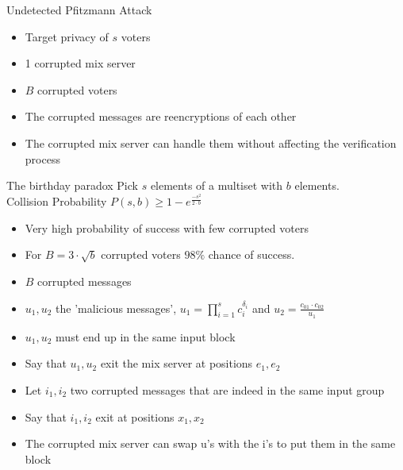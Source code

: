 \documentclass{beamer}
\begin{document}
\begin{frame}[allowframebreaks]{Undetected Pfitzmann Attack}
\begin{itemize}
\item Target privacy of $s$ voters
\item 1 corrupted mix server
\item $B$ corrupted voters
\item The corrupted messages are reencryptions of each other
\item The corrupted mix server can handle them without affecting the verification process 
\end{itemize}
\begin{block}{The birthday paradox}
Pick $s$ elements of a multiset with $b$ elements. \\
Collision Probability $P(s,b) \geq 1 - e ^ \frac{-s^2}{2 \cdot b}$
\end{block}
\begin{itemize}
\item Very high probability of success with few corrupted voters
\item For $B=3 \cdot \sqrt{b}$ corrupted voters $98\%$ chance of success.

\end{itemize}

\framebreak

\begin{itemize}

\item $B$ corrupted messages
\item $u_1, u_2$ the 'malicious messages', $u_1=\prod_{i=1}^s c_i^{\delta_i}$ and $u_2 = \frac{c_{01} \cdot c_{02}}{u_1}$
\item $u_1, u_2$ must end up in the same input block
\item Say that $u_1, u_2$ exit the mix server at positions $e_1, e_2$
\item Let $i_1, i_2$ two corrupted messages that are indeed in the same input group
\item Say that $i_1, i_2$ exit at positions $x_1, x_2$
\item The corrupted mix server can swap u's with the i's to put them in the same block

\framebreak


\end{itemize}
\end{frame}
\end{document}
